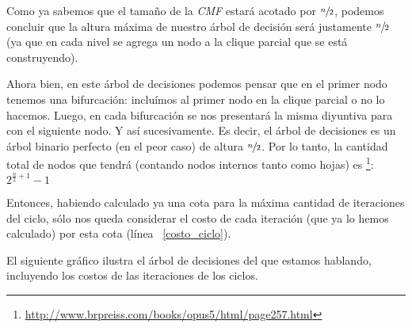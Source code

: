 \par Como ya sabemos que el tama\~no de la \emph{CMF} estar\'a acotado por
    $\sfrac{n}{2}$, podemos concluir que la altura m\'axima de nuestro \'arbol
    de decisi\'on ser\'a justamente $\sfrac{n}{2}$ (ya que en cada nivel se
    agrega un nodo a la clique parcial que se est\'a construyendo).

\par Ahora bien, en este \'arbol de decisiones podemos pensar que en el primer nodo
    tenemos una bifurcaci\'on: inclu\'imos al primer nodo en la clique parcial o
    no lo hacemos. Luego, en cada bifurcaci\'on se nos presentar\'a la misma
    diyuntiva para con el siguiente nodo. Y as\'i sucesivamente. Es decir, el
    \'arbol de decisiones es un \'arbol binario perfecto (en el peor caso) de
    altura $\sfrac{n}{2}$. Por lo tanto, la cantidad total de nodos que tendr\'a
    (contando nodos internos tanto como hojas) es%
    \footnote{\url{http://www.brpreiss.com/books/opus5/html/page257.html}}:
    $2^{\frac{n}{2}+1} -1$

\bigskip
\par Entonces, habiendo calculado ya una cota para la m\'axima cantidad de iteraciones
    del ciclo, s\'olo nos queda considerar el costo de cada iteraci\'on (que ya
    lo hemos calculado) por esta cota (l\'inea ~\ref{costo_ciclo}).

\par El siguiente gr\'afico ilustra el \'arbol de decisiones del que estamos hablando,
    incluyendo los costos de las iteraciones de los ciclos.

